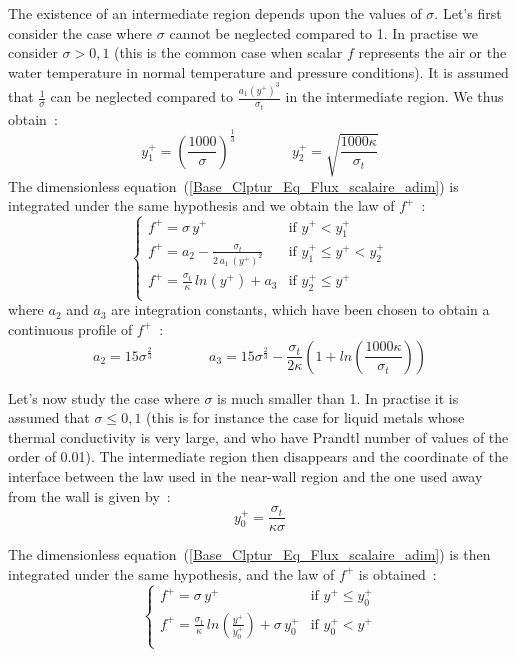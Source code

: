 The existence of an intermediate region depends upon the
values of $\sigma$.
Let's first consider the case where $\sigma$ cannot be neglected
compared to 1. In practise we consider  $\sigma > 0,1$
(this is the common case when scalar $f$ represents
the air or the water temperature in normal temperature
and pressure conditions). It is assumed that
$\displaystyle\frac{1}{\sigma}$ can be neglected compared to
$\displaystyle\frac{a_1 (y^+)^3}{\sigma_t}$ in the
intermediate region.
We thus obtain~:
\begin{equation}
  y^+_1 =\left(\displaystyle\frac{1000}{\sigma}\right)^\frac{1}{3} \qquad\qquad
  y^+_2 = \sqrt{\displaystyle\frac{1000\kappa}{\sigma_t}}
\end{equation}
The dimensionless equation~(\ref{Base_Clptur_Eq_Flux_scalaire_adim})
is integrated under the same hypothesis and we obtain the law of $f^+$~:
\begin{equation}
\left\{
\begin{array}{ll}
f^+ = \sigma \,y^+ & \text{if } y^+ < y^+_1 \\
f^+ = a_2 -\displaystyle\frac{\sigma_t}{2\,a_1\,(y^+)^2}& \text{if } y_1^+ \leqslant y^+ < y_2^+ \\
f^+ = \displaystyle\frac{\sigma_t}{\kappa}\,ln(y^+)+a_3& \text{if } y^+_2 \leqslant y^+\\
\end{array}
\right.
\end{equation}
where $a_2$ and $a_3$ are integration constants,
which have been chosen to obtain
a continuous  profile of $f^+$~:
\begin{equation}
a_2=15\sigma^{\frac{2}{3}}\qquad\qquad
a_3=15\sigma^{\frac{2}{3}}-\displaystyle\frac{\sigma_t}{2\kappa}
\left(1+
ln\left(\displaystyle\frac{1000\kappa}{\sigma_t}\right)\right)
\end{equation}

Let's now study the case where  $\sigma$ is much smaller than 1.
In practise it is assumed that $\sigma \leqslant 0,1$ (this is for
instance the case for liquid metals whose thermal conductivity is very
large, and who have Prandtl number of values of the order of 0.01).
The intermediate region then disappears and the coordinate of the
interface between the law used in the near-wall region and the one
used away from the wall is given by~:
\begin{equation}
y^+_0= \displaystyle\frac{\sigma_t}{\kappa\sigma}
\end{equation}

The dimensionless equation~(\ref{Base_Clptur_Eq_Flux_scalaire_adim})
is then integrated under the same hypothesis, and the law of
 $f^+$ is obtained~:
\begin{equation}
\left\{
\begin{array}{ll}
f^+ = \sigma \,y^+ & \text{if } y^+ \leqslant y^+_0 \\
f^+ = \displaystyle\frac{\sigma_t}{\kappa}\,
        ln\left(\displaystyle\frac{y^+}{y^+_0}\right)+\sigma \,y^+_0
                   & \text{if } y^+_0 < y^+\\
\end{array}
\right.
\end{equation}


